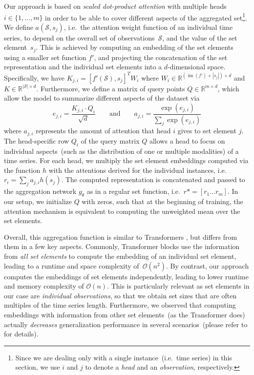 \documentclass{article}
\DeclareMathOperator{\im}    {im}
\newcommand{\real}     {\mathds{R}\xspace}
\newcommand{\attention}{a}
\begin{document}
Our approach is based on \emph{scaled dot-product attention} with
multiple heads $i \in \{1, \dots, m\}$ in order to be able to cover
different aspects of the aggregated set\footnote{Since we are dealing only with a single instance~(i.e.\ time series)
  in this section, we use $i$ and $j$ to denote
  a \emph{head} and an \emph{observation}, respectively.
}.
We define $\attention(\mathcal{S}, s_j)$, i.e.\ the attention weight
function of an individual time series, to depend on the overall set
of observations~$\mathcal{S}$, and the value of the set element~$s_j$.
This is achieved by computing an embedding of the set
elements using a smaller set function $f'$, and projecting the
concatenation of the set representation and the individual set elements
into a \mbox{$d$-dimensional} space. Specifically, we have
$K_{j, i} = [f'(\mathcal{S}), s_j]^T W_i$
where $W_i \in \real^{(\im(f') + |s_j|)\times d}$ and $K \in \real^{|\mathcal{S}| \times d}$.
Furthermore, we define a matrix of query points $Q \in \real^{m \times
d}$, which allow the model to summarize different aspects of the dataset
via
\begin{equation*}
  e_{j, i} = \frac{K_{j,i} \cdot Q_{i}}{\sqrt{d}} \quad\quad\text{and}\quad\quad \attention_{j, i} = \frac{\exp(e_{j,i})}{\sum_j \exp(e_{j,i})}
\end{equation*}
where $\attention_{j, i}$ represents the amount of attention that head $i$
gives to set element $j$.
The head-specific row $Q_i$ of the query matrix $Q$ allows a head to
focus on individual aspects~(such as the distribution of one or multiple
modalities) of a time series.
For each head, we multiply the set element embeddings
computed via the function $h$ with the attentions derived for the
individual instances, i.e.\ $r_{i} = \sum_j \attention_{j,i} h(s_j)$.
The computed representation is concatenated and passed to the aggregation
network $g_\theta$ as in a regular set function, i.e.\
$r* = [r_1 \dots r_m]$.
In our setup, we initialize $Q$ with zeros, such that at the beginning of
training, the attention mechanism is equivalent to computing the unweighted
mean over the set elements.

Overall, this aggregation function is similar to Transformers
\citep{vaswani2017attention}, but differs from them in a few key
aspects. Commonly, Transformer blocks use the information from
\emph{all set elements} to compute the embedding of an individual set element,
leading to a runtime and space complexity of~$\mathcal{O}(n^2)$. By contrast,
our approach computes the embeddings of set elements independently, leading
to lower runtime and memory complexity of $\mathcal{O}(n)$. This is
particularly relevant as set elements in our case are \emph{individual
observations}, so that we obtain  set sizes that are often multiples of the
time series length. Furthermore, we observed that computing embeddings
with information from other set elements~(as the Transformer does)
actually \emph{decreases} generalization performance in several
scenarios~(please refer to  for details).
\end{document}
